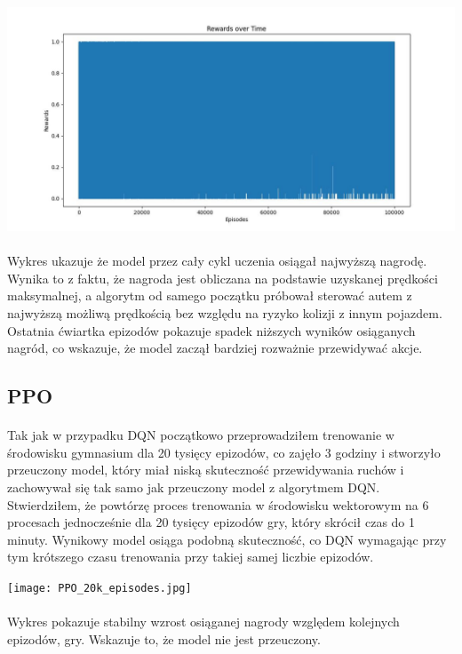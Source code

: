 \documentclass{article}
\begin{document}
\includegraphics[width=1\linewidth]{DQN+CNN.jpg}
\paragraph{}
Wykres ukazuje że model przez cały cykl uczenia osiągał najwyższą nagrodę. Wynika to z faktu, że nagroda jest obliczana na podstawie uzyskanej prędkości maksymalnej, a algorytm od samego początku próbował sterować autem z najwyższą możliwą prędkością bez względu na ryzyko kolizji z innym pojazdem. Ostatnia ćwiartka epizodów pokazuje spadek niższych wyników osiąganych nagród, co wskazuje, że model zaczął bardziej rozważnie przewidywać akcje.

\newpage

\subsection{PPO}
\paragraph{}
Tak jak w przypadku DQN początkowo przeprowadziłem trenowanie w środowisku gymnasium dla 20 tysięcy epizodów, co zajęło 3 godziny i stworzyło przeuczony model, który miał niską skuteczność przewidywania ruchów i zachowywał się tak samo jak przeuczony model z algorytmem DQN. Stwierdziłem, że powtórzę proces trenowania w środowisku wektorowym na 6 procesach jednocześnie dla 20 tysięcy epizodów gry, który skrócił czas do 1 minuty. Wynikowy model osiąga podobną skuteczność, co DQN wymagając przy tym krótszego czasu trenowania przy takiej samej liczbie epizodów.


\texttt{[image: PPO\_20k\_episodes.jpg]}

\paragraph{}
Wykres pokazuje stabilny wzrost osiąganej nagrody względem kolejnych epizodów, gry. Wskazuje to, że model nie jest przeuczony.
\end{document}
